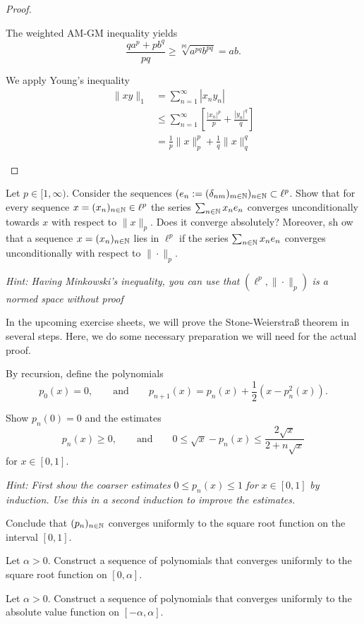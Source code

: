 \begin{proof}
	\begin{parts}
		\item The weighted AM-GM inequality yields
		\[
		\frac{q a^p + p b^q}{pq}\ge \sqrt[pq]{a^{pq} b^{pq}} =ab
		.\]
		\item We apply Young's inequality
		\begin{align*}
			\|xy\|_1 &= \sum_{n=1}^\infty |x_n y_n|\\
			&\le\sum_{n=1}^{\infty} \left[ \frac{|x_n|^p}{p}+\frac{|y_n|^q}{q} \right] \\
			&=\frac{1}{p}\|x\|_p^p+\frac{1}{q}\|x\|_q^q
		\end{align*}
	\end{parts}
\end{proof}
\begin{Problem}
	Let $p\in [1,\infty)$. Consider the sequences $(e_n:=(\delta_{nm})_{m\in \mathbb{N}})_{n\in \mathbb{N}}\subset \ell^p$. Show that for every sequence $x=(x_n)_{n\in \mathbb{N}}\in \ell^p$ the series $\sum_{n\in \mathbb{N}} x_n e_n$ converges unconditionally towards $x$ with respect to $\|x\|_p$. Does it converge absolutely? Moreover, sh ow that a sequence $x=(x_n)_{n\in \mathbb{N}}$ lies in $\ell^p$ if the series $\sum_{n\in \mathbb{N}}x_n e_n$ converges unconditionally with respect to $\|\cdot\|_p$.

	\emph{Hint: Having Minkowski's inequality, you can use that } $(\ell^p, \|\cdot\|_p)$ \emph{is a normed space without proof}
\end{Problem}
\begin{Problem}
	In the upcoming exercise sheets, we will prove the Stone-Weierstraß theorem in several steps. Here, we do some necessary preparation we will need for the actual proof.

	By recursion, define the polynomials
	\[
	p_0(x)=0,\qquad\text{and}\qquad p_{n+1}(x)=p_n(x)+\frac{1}{2}(x-p_n^2(x))
	.\] 
	\begin{parts}
	\item Show $p_n(0)=0$ and the estimates
		\[
		p_n(x)\ge 0,\qquad \text{and}\qquad 0\le \sqrt{x} -p_n(x)\le \frac{2\sqrt{x} }{2+n\sqrt{x} }
		\]
		for $x\in [0,1]$.

		\emph{Hint: First show the coarser estimates} $0\le p_n(x)\le 1$ \emph{ for }$x\in [0,1]$ \emph{by induction. Use this in a second induction to improve the estimates.}
	\item Conclude that $(p_n)_{n\in \mathbb{N}}$ converges uniformly to the square root function on the interval $[0,1]$.
	\item Let $\alpha>0$. Construct a sequence of polynomials that converges uniformly to the square root function on $[0,\alpha]$.
	\item Let $\alpha>0$. Construct a sequence of polynomials that converges uniformly to the absolute value function on $[-\alpha, \alpha]$.
	\end{parts}
\end{Problem}
